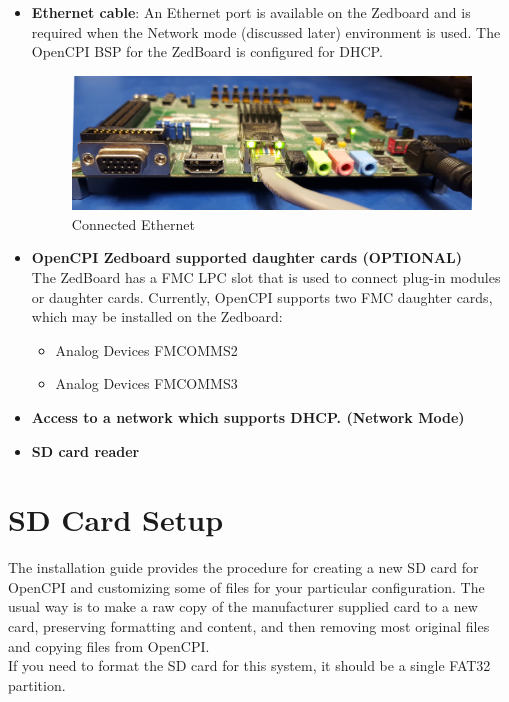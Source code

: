 \begin{flushleft}
\begin{itemize}
\item \textbf{Ethernet cable}:
An Ethernet port is available on the Zedboard and is required when the Network mode (discussed later) environment is used. The OpenCPI BSP for the ZedBoard is configured for DHCP.\medskip

\begin{figure}[H]
	\centerline{\includegraphics[scale=0.05]{zed_ether}}
	\caption{Connected Ethernet}
	\label{fig:zed_ether}
\end{figure}

\item \textbf{OpenCPI Zedboard supported daughter cards (OPTIONAL)}\\
The ZedBoard has a FMC LPC slot that is used to connect plug-in modules or daughter cards. Currently, OpenCPI supports two FMC daughter cards, which may be installed on the Zedboard:
\begin{itemize}
	\item Analog Devices FMCOMMS2
	\item Analog Devices FMCOMMS3
\end{itemize} \medskip

\item \textbf{Access to a network which supports DHCP. (Network Mode)}

\item \textbf{SD card reader}
\end{itemize}
\end{flushleft}

\section{SD Card Setup}
\label{sec:SD_Card_Setup}
The installation guide provides the procedure for creating a new SD card for OpenCPI and customizing some of files for your particular configuration.  The usual way is to make a raw copy of the manufacturer supplied card to a new card, preserving formatting and content, and then removing most original files and copying files from OpenCPI.\\ \medskip
If you need to format the SD card for this system, it should be a single FAT32 partition.

